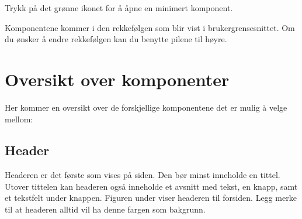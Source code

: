Trykk på det grønne ikonet for å åpne en minimert komponent.

\begin{figure}[H]
    \centering
    \label{fig:cms-open}
\end{figure}

Komponentene kommer i den rekkefølgen som blir vist i brukergrensesnittet. Om du ønsker å endre rekkefølgen kan du benytte pilene til høyre. 
\begin{figure}[H]
    \centering
    \label{fig:cms-up-down}
\end{figure}

\section{Oversikt over komponenter}
Her kommer en oversikt over de forskjellige komponentene det er mulig å velge mellom:

\subsection{Header}
Headeren er det første som vises på siden. Den bør minst inneholde en tittel. Utover tittelen kan headeren også inneholde et avsnitt med tekst, en knapp, samt et tekstfelt under knappen. Figuren under viser headeren til forsiden. Legg merke til at headeren alltid vil ha denne fargen som bakgrunn.

